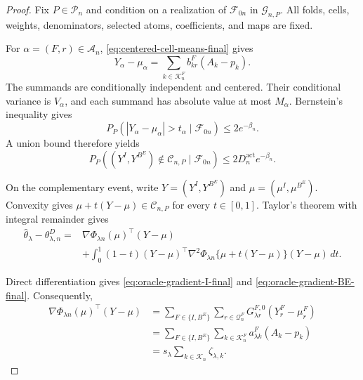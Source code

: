 \documentclass[11pt]{article}
\theoremstyle{definition}
\newcommand{\1}{\mathbf 1}\newcommand{\op}{\operatorname}
\begin{document}
\begin{proof}
Fix $P\in\mathcal P_n$ and condition on a realization of
$\mathcal F_{0n}$ in $\mathcal G_{n,P}$. All folds, cells, weights,
denominators, selected atoms, coefficients, and maps are fixed.

For $\alpha=(F,r)\in\mathcal A_n$,
\eqref{eq:centered-cell-means-final} gives
\[
Y_\alpha-\mu_\alpha
=
\sum_{k\in\mathcal K_n^F}
b_{kr}^F(A_k-p_k).
\]
The summands are conditionally independent and centered. Their
conditional variance is $V_\alpha$, and each summand has absolute
value at most $M_\alpha$. Bernstein's inequality gives
\begin{equation}
P_P\!\left(
|Y_\alpha-\mu_\alpha|>t_\alpha
\mid\mathcal F_{0n}
\right)
\le2e^{-\beta_n}.
\label{eq:coordinate-bernstein-final}
\end{equation}
A union bound therefore yields
\begin{equation}
P_P\!\left(
(Y^I,Y^{B^E})\notin\mathcal C_{n,P}
\mid\mathcal F_{0n}
\right)
\le
2D_n^{\mathrm{act}}e^{-\beta_n}.
\label{eq:rectangle-probability-final}
\end{equation}

On the complementary event, write
$Y=(Y^I,Y^{B^E})$ and
$\mu=(\mu^I,\mu^{B^E})$. Convexity gives
$\mu+t(Y-\mu)\in\mathcal C_{n,P}$ for every $t\in[0,1]$.
Taylor's theorem with integral remainder gives
\begin{equation}
\begin{split}
\widehat\theta_\lambda-\theta_{\lambda,n}^D
={}&
\nabla\Phi_{\lambda n}(\mu)^\top(Y-\mu)\\
&+
\int_0^1(1-t)
(Y-\mu)^\top
\nabla^2\Phi_{\lambda n}\{\mu+t(Y-\mu)\}
(Y-\mu)\,dt .
\end{split}
\label{eq:taylor-integral-final}
\end{equation}

Direct differentiation gives
\eqref{eq:oracle-gradient-I-final} and
\eqref{eq:oracle-gradient-BE-final}. Consequently,
\begin{equation}
\begin{split}
\nabla\Phi_{\lambda n}(\mu)^\top(Y-\mu)
&=
\sum_{F\in\{I,B^E\}}
\sum_{r\in\mathcal Q_n^F}
G_{\lambda r}^{F,0}(Y_r^F-\mu_r^F)\\
&=
\sum_{F\in\{I,B^E\}}
\sum_{k\in\mathcal K_n^F}
a_{\lambda k}^F(A_k-p_k)\\
&=
s_\lambda
\sum_{k\in\mathcal K_n}\zeta_{\lambda,k}.
\end{split}
\label{eq:linear-term-final}
\end{equation}


\end{proof}
\end{document}
